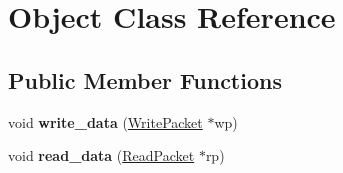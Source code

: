 \hypertarget{class_object}{\section{Object Class Reference}
\label{class_object}
}
\subsection*{Public Member Functions}
\begin{DoxyCompactItemize}
\item 
\hypertarget{class_object_a9b9c9d7a76b1dae92f07c51181513ca4}{void {\bfseries write\-\_\-data} (\hyperlink{class_write_packet}{Write\-Packet} $\ast$wp)}\label{class_object_a9b9c9d7a76b1dae92f07c51181513ca4}

\item 
\hypertarget{class_object_a38c8d7375c607ed8c60c7a21c1dfc21d}{void {\bfseries read\-\_\-data} (\hyperlink{class_read_packet}{Read\-Packet} $\ast$rp)}\label{class_object_a38c8d7375c607ed8c60c7a21c1dfc21d}

\end{DoxyCompactItemize}
